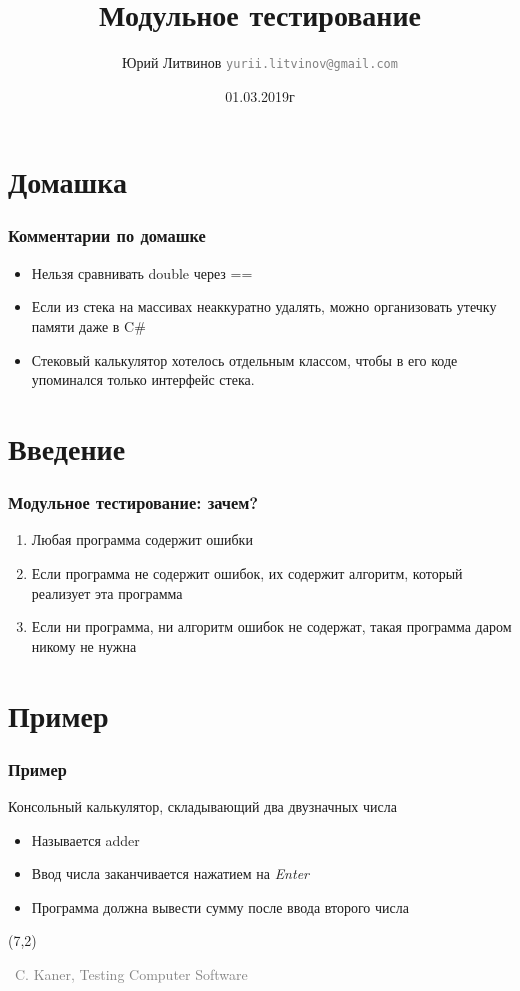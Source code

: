 \documentclass[xetex,mathserif,serif]{beamer}
\title{Модульное тестирование}
\author[Юрий Литвинов]{Юрий Литвинов \newline \textcolor{gray}{\small\texttt{yurii.litvinov@gmail.com}}}
\date{01.03.2019г}
\newcommand{\attribution}[1] {
	\begin{flushright}\begin{scriptsize}\textcolor{gray}{\textcopyright\, #1}\end{scriptsize}\end{flushright}
}
\begin{document}
	
	\frame{\titlepage}

	\section{Домашка}

	\begin{frame}
		\frametitle{Комментарии по домашке}
		\begin{itemize}
			\item Нельзя сравнивать double через ==
			\item Если из стека на массивах неаккуратно удалять, можно организовать утечку памяти даже в C\#
			\item Стековый калькулятор хотелось отдельным классом, чтобы в его коде упоминался только интерфейс стека.
		\end{itemize}
	\end{frame}

	\section{Введение}

	\begin{frame}
		\frametitle{Модульное тестирование: зачем?}
		\begin{enumerate}
			\item Любая программа содержит ошибки
			\item Если программа не содержит ошибок, их содержит алгоритм, который реализует эта программа
			\item Если ни программа, ни алгоритм ошибок не содержат, такая программа даром никому не нужна
		\end{enumerate}
	\end{frame}

	\section{Пример}

	\begin{frame}
		\frametitle{Пример}
		Консольный калькулятор, складывающий два двузначных числа
		\begin{itemize}
			\item Называется adder
			\item Ввод числа заканчивается нажатием на \textit{Enter}
			\item Программа должна вывести сумму после ввода второго числа
		\end{itemize}
		\begin{textblock}{5}(7,2)
			\attribution{C. Kaner, Testing Computer Software}
		\end{textblock}
	\end{frame}
\end{document}
